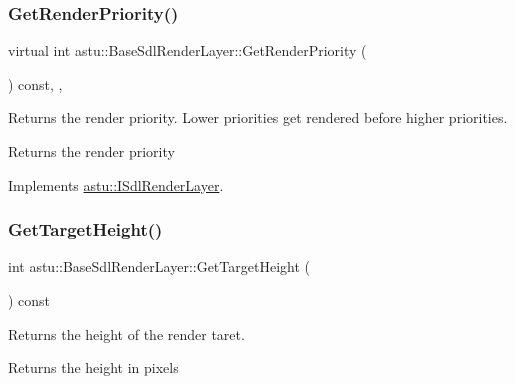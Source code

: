 \subsubsection{\texorpdfstring{Get\+Render\+Priority()}{GetRenderPriority()}}
{\footnotesize\ttfamily virtual int astu\+::\+Base\+Sdl\+Render\+Layer\+::\+Get\+Render\+Priority (\begin{DoxyParamCaption}{ }\end{DoxyParamCaption}) const\hspace{0.3cm}{\ttfamily [final]}, {\ttfamily [override]}, {\ttfamily [virtual]}}

Returns the render priority. Lower priorities get rendered before higher priorities.

\begin{DoxyReturn}{Returns}
the render priority 
\end{DoxyReturn}


Implements \hyperlink{classastu_1_1ISdlRenderLayer_a623b411a1afa967bdaa879f5075eec43}{astu\+::\+I\+Sdl\+Render\+Layer}.

\mbox{\label{classastu_1_1BaseSdlRenderLayer_a6e897555380c2ba39af2d6a10c79283f}} 
\subsubsection{\texorpdfstring{Get\+Target\+Height()}{GetTargetHeight()}}
{\footnotesize\ttfamily int astu\+::\+Base\+Sdl\+Render\+Layer\+::\+Get\+Target\+Height (\begin{DoxyParamCaption}{ }\end{DoxyParamCaption}) const\hspace{0.3cm}{\ttfamily [inline]}}

Returns the height of the render taret.

\begin{DoxyReturn}{Returns}
the height in pixels 
\end{DoxyReturn}
\mbox{\label{classastu_1_1BaseSdlRenderLayer_a535b982190208e361f6b2c3cd717cb97}} 
